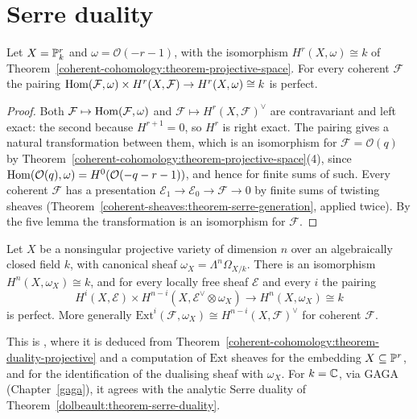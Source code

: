 \section{Serre duality}\label{coherent-cohomology:section-serre-duality}

\begin{theorem}\label{coherent-cohomology:theorem-duality-projective}
Let $X = \mathbb{P}^r_k$ and $\omega = \mathcal{O}(-r-1)$, with the isomorphism $H^r(X, \omega) \cong k$ of Theorem~\ref{coherent-cohomology:theorem-projective-space}. For every coherent
$\mathcal{F}$ the pairing $\operatorname{Hom}(\mathcal{F}, \omega) \times H^r(X, \mathcal{F}) \to H^r(X, \omega) \cong k$ is perfect.
\end{theorem}

\begin{proof}
Both $\mathcal{F} \mapsto \operatorname{Hom}(\mathcal{F}, \omega)$ and $\mathcal{F} \mapsto H^r(X, \mathcal{F})^\vee$ are contravariant and left exact: the second because $H^{r+1} = 0$, so $H^r$ is right exact.
The pairing gives a natural transformation between them, which is an isomorphism for $\mathcal{F} = \mathcal{O}(q)$ by
Theorem~\ref{coherent-cohomology:theorem-projective-space}(4), since $\operatorname{Hom}(\mathcal{O}(q), \omega) = H^0(\mathcal{O}(-q-r-1))$, and hence for finite sums of such.
Every coherent $\mathcal{F}$ has a presentation $\mathcal{E}_1 \to \mathcal{E}_0 \to \mathcal{F} \to 0$ by finite sums of twisting sheaves
(Theorem~\ref{coherent-sheaves:theorem-serre-generation}, applied twice). By the five lemma the transformation is an isomorphism for $\mathcal{F}$.
\end{proof}

\begin{theorem}\label{coherent-cohomology:theorem-serre-duality}
Let $X$ be a nonsingular projective variety of dimension $n$ over an algebraically closed field $k$, with canonical sheaf $\omega_X = \Lambda^n\Omega_{X/k}$. There is an
isomorphism $H^n(X, \omega_X) \cong k$, and for every locally free sheaf $\mathcal{E}$ and every $i$ the pairing
\[
H^i(X, \mathcal{E}) \times H^{n-i}(X, \mathcal{E}^\vee \otimes \omega_X) \to H^n(X, \omega_X) \cong k
\]
is perfect. More generally $\mathrm{Ext}^i(\mathcal{F}, \omega_X) \cong H^{n-i}(X, \mathcal{F})^\vee$ for coherent $\mathcal{F}$.
\end{theorem}

This is \cite[Theorem III.7.6 and Corollary III.7.7]{hartshorne-ag}, where it is deduced from Theorem~\ref{coherent-cohomology:theorem-duality-projective} and a computation of
$\mathrm{Ext}$ sheaves for the embedding $X \subseteq \mathbb{P}^r$, and \cite[Corollary III.7.12]{hartshorne-ag} for the identification of the dualising sheaf with $\omega_X$. For
$k = \mathbb{C}$, via GAGA (Chapter~\ref{gaga}), it agrees with the analytic Serre duality of Theorem~\ref{dolbeault:theorem-serre-duality}.

